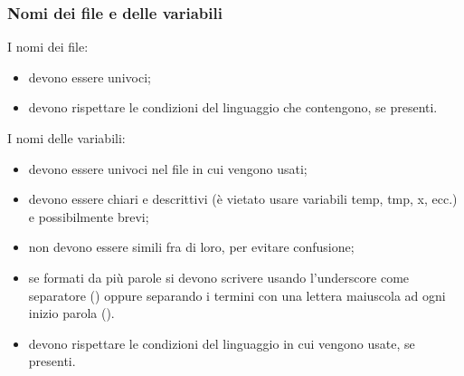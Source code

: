 \subsubsection{Nomi dei file e delle variabili}
I nomi dei file:
\begin{itemize}
    \item devono essere univoci;
    \item devono rispettare le condizioni del linguaggio che contengono, se presenti.
\end{itemize}
I nomi delle variabili:
\begin{itemize}
    \item devono essere univoci nel file in cui vengono usati;
    \item devono essere chiari e descrittivi (è vietato usare variabili temp, tmp, x, ecc.) e possibilmente brevi;
    \item non devono essere simili fra di loro, per evitare confusione;
    \item se formati da più parole si devono scrivere usando l'underscore come separatore () oppure separando i termini con una lettera maiuscola ad ogni inizio parola ().
    \item devono rispettare le condizioni del linguaggio in cui vengono usate, se presenti.
\end{itemize}